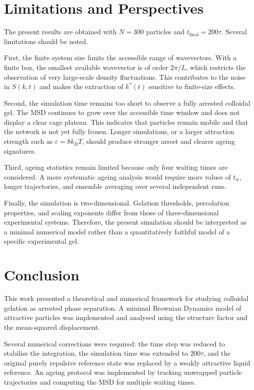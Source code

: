 \documentclass[11pt,a4paper]{article}
\begin{document}
\section{Limitations and Perspectives}

The present results are obtained with $N=300$ particles and $t_{\mathrm{final}}=200\tau$. Several limitations should be noted.

First, the finite system size limits the accessible range of wavevectors. With a finite box, the smallest available wavevector is of order $2\pi/L$, which restricts the observation of very large-scale density fluctuations. This contributes to the noise in $S(k,t)$ and makes the extraction of $k^*(t)$ sensitive to finite-size effects.

Second, the simulation time remains too short to observe a fully arrested colloidal gel. The MSD continues to grow over the accessible time window and does not display a clear cage plateau. This indicates that particles remain mobile and that the network is not yet fully frozen. Longer simulations, or a larger attraction strength such as $\varepsilon=8k_BT$, should produce stronger arrest and clearer ageing signatures.

Third, ageing statistics remain limited because only four waiting times are considered. A more systematic ageing analysis would require more values of $t_w$, longer trajectories, and ensemble averaging over several independent runs.

Finally, the simulation is two-dimensional. Gelation thresholds, percolation properties, and scaling exponents differ from those of three-dimensional experimental systems. Therefore, the present simulation should be interpreted as a minimal numerical model rather than a quantitatively faithful model of a specific experimental gel.

\section{Conclusion}

This work presented a theoretical and numerical framework for studying colloidal gelation as arrested phase separation. A minimal Brownian Dynamics model of attractive particles was implemented and analysed using the structure factor and the mean-squared displacement.

Several numerical corrections were required: the time step was reduced to stabilise the integration, the simulation time was extended to $200\tau$, and the original purely repulsive reference state was replaced by a weakly attractive liquid reference. An ageing protocol was implemented by tracking unwrapped particle trajectories and computing the MSD for multiple waiting times.
\end{document}
